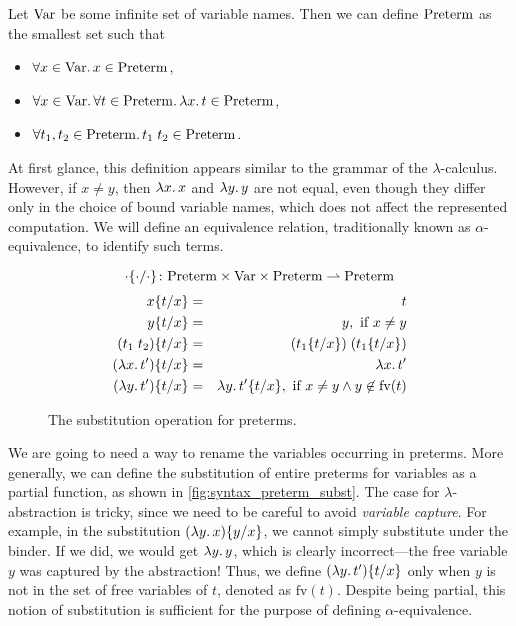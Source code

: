 \newcommand\Preterm{\syncatset{Preterm}}
\newcommand\Term{\syncatset{Term}}
\newcommand\Var{\syncatset{Var}}
\newcommand\FVars[1]{\mathrm{fv}(#1)}
\newcommand\Subst[3]{#1\{#2/#3\}}
\newcommand\Aeq{\equiv_\alpha}

Let $\Var$ be some infinite set of variable names.
Then we can define $\Preterm$ as the smallest set such that
\begin{itemize}
\item $\forall x \in \Var\ldotp x \in \Preterm$,
\item $\forall x \in \Var\ldotp\forall t \in \Preterm\ldotp \lambda x\ldotp t \in \Preterm$,
\item $\forall t_1, t_2 \in \Preterm\ldotp t_1\;t_2 \in \Preterm$.
\end{itemize}
At first glance, this definition appears similar to the grammar of the
$\lambda$-calculus.
However, if $x \neq y$, then $\lambda x\ldotp x$ and $\lambda y\ldotp y$ are
not equal, even though they differ only in the choice of bound variable names,
which does not affect the represented computation. We will define an
equivalence relation, traditionally known as $\alpha$-equivalence, to identify
such terms.

\begin{figure}[t!!]
\[
  \Subst{\cdot}{\cdot}{\cdot} \colon
  \Preterm \times \Var \times \Preterm \rightharpoonup \Preterm
\]
\begin{eqnarray*}
  \Subst{x}{t}{x}          & = & t \\
  \Subst{y}{t}{x}          & = & y, \text{ if } x \ne y \\
  \Subst{(t_1\;t_2)}{t}{x} & = & (\Subst{t_1}{t}{x})\;(\Subst{t_1}{t}{x}) \\
  \Subst{(\lambda x\ldotp t')}{t}{x} & = & \lambda x\ldotp t' \\
  \Subst{(\lambda y\ldotp t')}{t}{x} & = & \lambda y\ldotp \Subst{t'}{t}{x}, \text{ if } x \ne y \land y \not\in \FVars{t}
\end{eqnarray*}
\caption{The substitution operation for preterms.}
\label{fig:syntax_preterm_subst}
\end{figure}

We are going to need a way to rename the variables occurring in preterms.
More generally, we can define the substitution of entire preterms for
variables as a partial function, as shown in
\autoref{fig:syntax_preterm_subst}.
The case for $\lambda$-abstraction is tricky, since we need to be careful
to avoid \emph{variable capture}.
For example, in the substitution $\Subst{(\lambda y\ldotp x)}{y}{x}$,
we cannot simply substitute under the binder. If we did, we would get
$\lambda y \ldotp y$, which is clearly incorrect---the free variable $y$ was
captured by the abstraction!
Thus, we define $\Subst{(\lambda y\ldotp t')}{t}{x}$ only when $y$ is not in
the set of free variables of $t$, denoted as $\FVars{t}$. Despite being
partial, this notion of substitution is sufficient for the purpose of defining
$\alpha$-equivalence.

